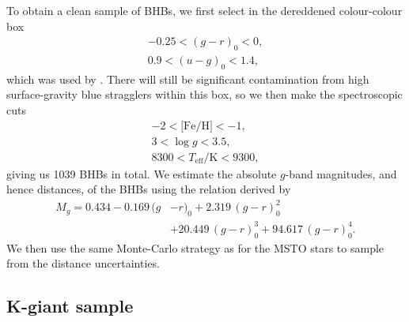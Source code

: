 \documentclass[useAMS,twocolumn,usenatbib]{mn2e}
\begin{document}
To obtain a clean sample of BHBs, we first select in the dereddened colour-colour box
%
\begin{gather}
-0.25 < (g-r)_0 < 0, \nonumber \\
0.9 < (u-g)_0 < 1.4,
\end{gather}
%
which was used by \cite{De11}. 
There will still be significant contamination from high surface-gravity blue stragglers within this box, so we then make the spectroscopic cuts
%
\begin{gather}
-2 < \lbrack \mathrm{Fe/H} \rbrack < -1, \nonumber \\
3 < \log g < 3.5, \\
8300 < T_\mathrm{eff}/\mathrm{K} < 9300, \nonumber
\end{gather}
%
giving us 1039 BHBs in total. 
We estimate the absolute $g$-band magnitudes, and hence distances, of the BHBs using the relation derived by \cite{De11}
%
\begin{equation}
\begin{split}
M_g = 0.434 - 0.169\,(g{}&-r)_0+2.319\,(g-r)_0^2  \\
         {}&+20.449\,(g-r)_0^3+94.617\,(g-r)_0^4.
\end{split}
\end{equation}
%
We then use the same Monte-Carlo strategy as for the MSTO stars to sample from the distance uncertainties.


\subsection{K-giant sample}
\end{document}
